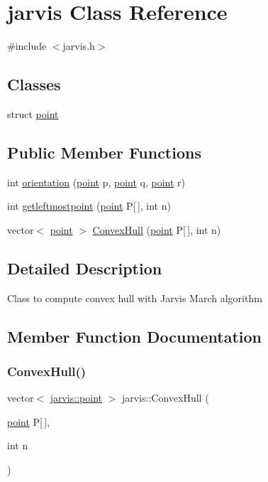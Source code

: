 \hypertarget{classjarvis}{}\section{jarvis Class Reference}
\label{classjarvis}


{\ttfamily \#include $<$jarvis.\+h$>$}

\subsection*{Classes}
\begin{DoxyCompactItemize}
\item 
struct \hyperlink{structjarvis_1_1point}{point}
\end{DoxyCompactItemize}
\subsection*{Public Member Functions}
\begin{DoxyCompactItemize}
\item 
int \hyperlink{classjarvis_a2f27b457b2c03383d75de6c2e64d3c78}{orientation} (\hyperlink{structjarvis_1_1point}{point} p, \hyperlink{structjarvis_1_1point}{point} q, \hyperlink{structjarvis_1_1point}{point} r)
\item 
int \hyperlink{classjarvis_a0086d1ec638f6cf9d8ab77506222f71a}{getleftmostpoint} (\hyperlink{structjarvis_1_1point}{point} P\mbox{[}$\,$\mbox{]}, int n)
\item 
vector$<$ \hyperlink{structjarvis_1_1point}{point} $>$ \hyperlink{classjarvis_a03bda2b2eba1b8c1d94470cf16f43819}{Convex\+Hull} (\hyperlink{structjarvis_1_1point}{point} P\mbox{[}$\,$\mbox{]}, int n)
\end{DoxyCompactItemize}


\subsection{Detailed Description}
Class to compute convex hull with Jarvis March algorithm 

\subsection{Member Function Documentation}
\mbox{\label{classjarvis_a03bda2b2eba1b8c1d94470cf16f43819}} 
\subsubsection{\texorpdfstring{Convex\+Hull()}{ConvexHull()}}
{\footnotesize\ttfamily vector$<$ \hyperlink{structjarvis_1_1point}{jarvis\+::point} $>$ jarvis\+::\+Convex\+Hull (\begin{DoxyParamCaption}\item[{\hyperlink{structjarvis_1_1point}{point}}]{P\mbox{[}$\,$\mbox{]},  }\item[{int}]{n }\end{DoxyParamCaption})}

